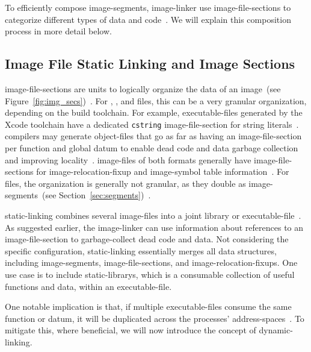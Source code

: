 To efficiently compose \glspl{image-segment}, \gls{image-linker} use \glspl{image-file-section} to categorize different types of data and code~\cite{levine2000linkers}. We will explain this composition process in more detail below.

\subsection{Image File Static Linking and Image Sections}
\label{sec:sections}

\Glspl{image-file-section} are units to logically organize the data of an \gls{image}~(see Figure~\ref{fig:img_secs})~\cite{elf-spec,macho-spec,pe-format,levine2000linkers}. For , , and  files, this can be a very granular organization, depending on the build toolchain. For example,  \glspl{executable-file} generated by the  Xcode toolchain have a dedicated \texttt{cstring} \gls{image-file-section} for string literals~\cite{macho-spec}.  compilers may generate \glspl{object-file} that go as far as having an \gls{image-file-section} per function and global datum to enable dead code and data garbage collection and improving locality~\cite{gcc}. \Glspl{image-file} of both formats generally have \glspl{image-file-section} for \gls{image-relocation-fixup} and \gls{image-symbol} table information~\cite{elf-spec,macho-spec}. For  files, the organization is generally not granular, as they double as \glspl{image-segment}~(see Section~\ref{sec:segments})~\cite{pe-format}.

\Gls{static-linking} combines several \glspl{image-file} into a joint \gls{library} or \gls{executable-file}~\cite{levine2000linkers}. As suggested earlier, the \gls{image-linker} can use information about references to an \gls{image-file-section} to garbage-collect dead code and data. Not considering the specific configuration, \gls{static-linking} essentially merges all data structures, including \glspl{image-segment}, \glspl{image-file-section}, and \glspl{image-relocation-fixup}. One use case is to include \glspl{static-library}, which is a consumable collection of useful functions and data, within an \gls{executable-file}.

One notable implication is that, if multiple \glspl{executable-file} consume the same function or datum, it will be duplicated across the processes' \glspl{address-space}~\cite{levine2000linkers}. To mitigate this, where beneficial, we will now introduce the concept of \gls{dynamic-linking}.

